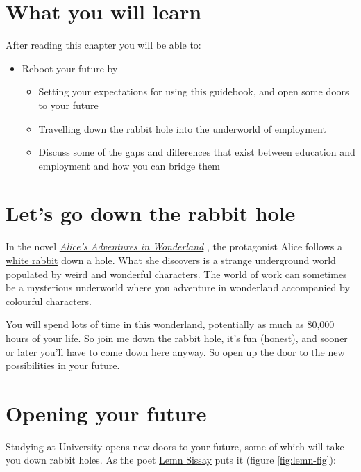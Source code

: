 \documentclass[
]{book}
\providecommand{\tightlist}{%
  \setlength{\itemsep}{0pt}\setlength{\parskip}{0pt}}
\begin{document}
\hypertarget{ilo1}{%
\section{What you will learn}\label{ilo1}}

After reading this chapter you will be able to:

\begin{itemize}
\tightlist
\item
  Reboot your future by

  \begin{itemize}
  \tightlist
  \item
    Setting your expectations for using this guidebook, and open some doors to your future
  \item
    Travelling down the rabbit hole into the underworld of employment
  \item
    Discuss some of the gaps and differences that exist between education and employment and how you can bridge them
  \end{itemize}
\end{itemize}

\hypertarget{wonderland}{%
\section{Let's go down the rabbit hole}\label{wonderland}}

In the novel \emph{\href{https://en.wikipedia.org/wiki/Alice\%27s_Adventures_in_Wonderland}{Alice's Adventures in Wonderland}} \citep{wonderland}, the protagonist Alice follows a \href{https://en.wikipedia.org/wiki/White_Rabbit}{white rabbit} down a hole. What she discovers is a strange underground world populated by weird and wonderful characters. The world of work can sometimes be a mysterious underworld where you adventure in wonderland accompanied by colourful characters.

You will spend lots of time in this wonderland, potentially as much as 80,000 hours of your life. \citep{iip1, iip2} So join me down the rabbit hole, it's fun (honest), and sooner or later you'll have to come down here anyway. So open up the door to the new possibilities in your future.

\hypertarget{opening}{%
\section{Opening your future}\label{opening}}

Studying at University opens new doors to your future, some of which will take you down rabbit holes. As the poet \href{https://en.wikipedia.org/wiki/Lemn_Sissay}{Lemn Sissay} puts it (figure \ref{fig:lemn-fig}):
\end{document}
